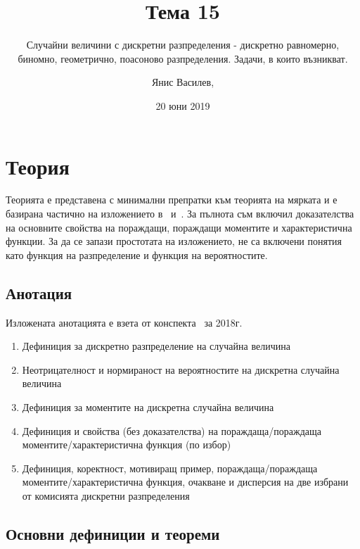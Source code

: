 \documentclass[numbers=endperiod, bibliography=totocnumbered]{scrartcl}
\title{Тема 15}
\subtitle{Случайни величини с дискретни разпределения - дискретно равномерно, биномно, геометрично, поасоново разпределения. Задачи, в които възникват.}
\author{Янис Василев, \Email{ianis@ivasilev.net}}
\date{20 юни 2019}
\begin{document}
\maketitle

\section{Теория}

Теорията е представена с минимални препратки към теорията на мярката и е базирана частично на изложението в~\cite{Borovkov} и~\cite{DimitrovYanev}. За пълнота съм включил доказателства на основните свойства на пораждащи, пораждащи моментите и характеристична функции. За да се запази простотата на изложението, не са включени понятия като функция на разпределение и функция на вероятностите.

\subsection{Анотация}

Изложената анотацията е взета от конспекта~\cite{Syllabus} за 2018г.

\begin{enumerate}
  \item Дефиниция за дискретно разпределение на случайна величина
  \item Неотрицателност и нормираност на вероятностите на дискретна случайна величина
  \item Дефиниция за моментите на дискретна случайна величина
  \item Дефиниция и свойства (без доказателства) на пораждаща/пораждаща моментите/характеристична функция (по избор)
  \item Дефиниция, коректност, мотивиращ пример, пораждаща/пораждаща моментите/характеристична функция, очакване и дисперсия на две избрани от комисията дискретни разпределения
\end{enumerate}

\subsection{Основни дефиниции и теореми}
\end{document}
